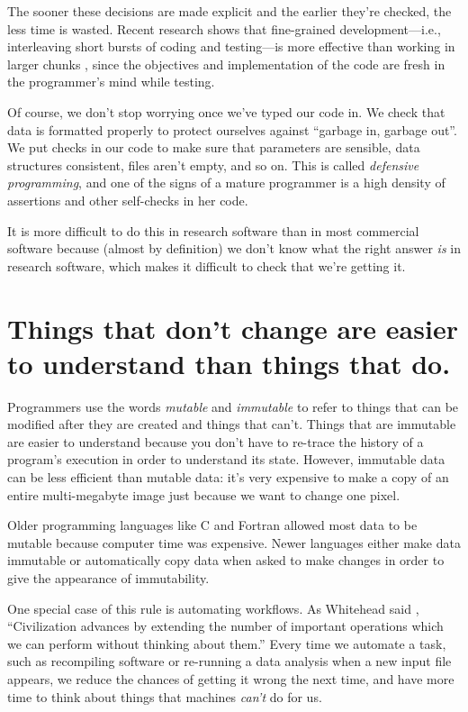 \documentclass[10pt,letterpaper]{article}
\newcommand{\rulemajor}[1]{\section{#1}}
\begin{document}
The sooner these decisions are made explicit and the earlier they're checked,
the less time is wasted.  Recent research shows that fine-grained
development---i.e., interleaving short bursts of coding and testing---is more
effective than working in larger chunks \cite{Fucc2017}, since the objectives
and implementation of the code are fresh in the programmer's mind while testing.

Of course, we don't stop worrying once we've typed our code in.  We check that
data is formatted properly to protect ourselves against ``garbage in, garbage
out''.  We put checks in our code to make sure that parameters are sensible,
data structures consistent, files aren't empty, and so on.  This is called
\emph{defensive programming}, and one of the signs of a mature programmer is
a high density of assertions and other self-checks in her code.

It is more difficult to do this in research software than in most commercial
software because (almost by definition) we don't know what the right answer
\emph{is} in research software, which makes it difficult to check that we're
getting it.

\rulemajor{Things that don't change are easier to understand than things that do.}

Programmers use the words \emph{mutable} and \emph{immutable} to refer to things
that can be modified after they are created and things that can't.  Things that
are immutable are easier to understand because you don't have to re-trace the
history of a program's execution in order to understand its state.  However,
immutable data can be less efficient than mutable data: it's very expensive to
make a copy of an entire multi-megabyte image just because we want to change one
pixel.

Older programming languages like C and Fortran allowed most data to be mutable
because computer time was expensive.  Newer languages either make data immutable
or automatically copy data when asked to make changes in order to give the
appearance of immutability.

One special case of this rule is automating workflows.  As Whitehead said
\cite{Whit1958}, ``Civilization advances by extending the number of important
operations which we can perform without thinking about them.''  Every time we
automate a task, such as recompiling software or re-running a data analysis when
a new input file appears, we reduce the chances of getting it wrong the next
time, and have more time to think about things that machines \emph{can't} do for
us.
\end{document}
